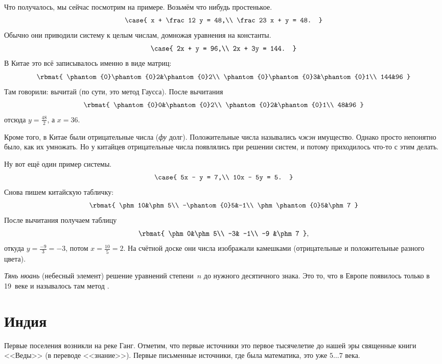 \documentclass[a4paper,oneside,fleqn,10pt]{article}
\newcommand{\phz}{\phantom{0}}
\newcommand{\pe}[2]{${#1}\ldots{#2}$}
\begin{document}
Что получалось, мы сейчас посмотрим на примере. Возьмём что нибудь простенькое.
$$
  \case{
    x + \frac12 y = 48,\\
    \frac23 x + y = 48.
  }
$$
Обычно они приводили систему к целым числам, домножая уравнения на константы.
$$
  \case{
    2x + y = 96,\\
    2x + 3y = 144.
  }
$$
В Китае это всё записывалось именно в виде матриц:
$$
  \rbmat{
    \phz\phz2&\phz2\\
    \phz\phz3&\phz1\\
    144&96
  }
$$
Там говорили: вычитай (по сути, это метод Гаусса). После вычитания
$$
  \rbmat{
    \phz0&\phz2\\
    \phz2&\phz1\\
    48&96
  }
$$
отсюда $y = \frac{48}{2}$, а $x = 36$.

Кроме того, в Китае были отрицательные числа (\emph{фу} долг).
Положительные числа назывались \emph{чжэн} имущество.
Однако просто непонятно было, как их умножать.
Но у китайцев отрицательные числа появлялись при решении систем,
и потому приходилось что-то с этим делать.

Ну вот ещё один пример системы.
$$
  \case{
    5x - y = 7,\\
    10x - 5y = 5.
  }
$$
Снова пишем китайскую табличку:
$$
  \rbmat{
    \phm10&\phm5\\
    -\phz5&-1\\
    \phm\phz5&\phm7
  }
$$
После вычитания получаем таблицу
$$
  \rbmat{
    \phm0&\phm5\\
    -3& -1\\
    -9 &\phm7
  },
$$
откуда $y = \frac{-9}{3} = -3$, потом $x = \frac{10}{5} =2$.
На счётной доске они числа изображали камешками (отрицательные и положительные
разного цвета).

\emph{Тянь нюань} (небесный элемент) решение уравнений степени~$n$
до нужного десятичного знака. Это то, что в Европе появилось только в 19~веке
и называлось там метод  .


\section{Индия}

Первые поселения возникли на реке Ганг. Отметим, что первые источники это первое тысячелетие до нашей
эры священные книги <<Веды>> (в переводе <<знание>>). Первые письменные
источники, где была математика, это уже \pe{5}{7} века.
\end{document}
